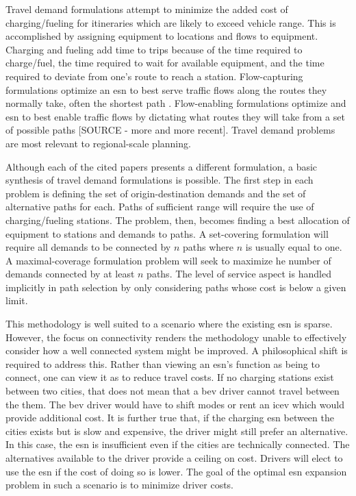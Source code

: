 Travel demand formulations attempt to minimize the added cost of charging/fueling for itineraries which are likely to exceed vehicle range. This is accomplished by assigning equipment to locations and flows to equipment. Charging and fueling add time to trips because of the time required to charge/fuel, the time required to wait for available equipment, and the time required to deviate from one's route to reach a station. Flow-capturing formulations optimize an \gls{esn} to best serve traffic flows along the routes they normally take, often the shortest path \citep{Kuby_2005, Kuby_2007, Upchurch_2009}. Flow-enabling formulations optimize and \gls{esn} to best enable traffic flows by dictating what routes they will take from a set of possible paths \citep{Kim_2012, MirHassani_2013, Huang_Li_2015, Li_Huang_2016, Zhang_2017, Arslan_2019, Anjos_2020} [SOURCE - more and more recent]. Travel demand problems are most relevant to regional-scale planning.

Although each of the cited papers presents a different formulation, a basic synthesis of travel demand formulations is possible. The first step in each problem is defining the set of origin-destination demands and the set of alternative paths for each. Paths of sufficient range will require the use of charging/fueling stations. The problem, then, becomes finding a best allocation of equipment to stations and demands to paths. A set-covering formulation will require all demands to be connected by $n$ paths where $n$ is usually equal to one. A maximal-coverage formulation problem will seek to maximize he number of demands connected by at least $n$ paths. The level of service aspect is handled implicitly in path selection by only considering paths whose cost is below a given limit. 

This methodology is well suited to a scenario where the existing \gls{esn} is sparse. However, the focus on connectivity renders the methodology unable to effectively consider how a well connected system might be improved. A philosophical shift is required to address this. Rather than viewing an \gls{esn}'s function as being to connect, one can view it as to reduce travel costs. If no charging stations exist between two cities, that does not mean that a \gls{bev} driver cannot travel between the them. The \gls{bev} driver would have to shift modes or rent an \gls{icev} which would provide additional cost. It is further true that, if the charging \gls{esn} between the cities exists but is slow and expensive, the driver might still prefer an alternative. In this case, the \gls{esn} is insufficient even if the cities are technically connected. The alternatives available to the driver provide a ceiling on cost. Drivers will elect to use the \gls{esn} if the cost of doing so is lower. The goal of the optimal \gls{esn} expansion problem in such a scenario is to minimize driver costs.

